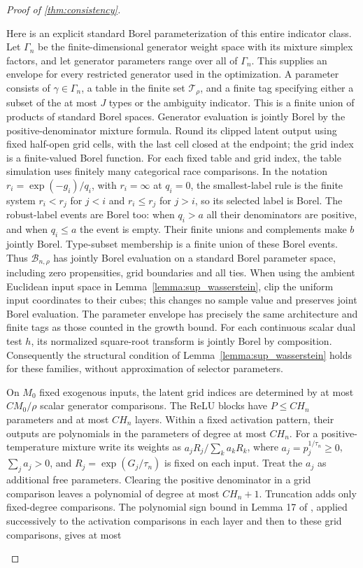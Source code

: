 \begin{proof}[Proof of \cref{thm:consistency}]
\begin{enumerate}
Here is an explicit standard Borel parameterization of this entire indicator class. Let $\Gamma_n$ be the finite-dimensional generator weight space with its mixture simplex factors, and let generator parameters range over all of $\Gamma_n$. This supplies an envelope for every restricted generator used in the optimization. A parameter consists of $\gamma\in\Gamma_n$, a table in the finite set $\mathcal T_\rho$, and a finite tag specifying either a subset of the at most $J$ types or the ambiguity indicator. This is a finite union of products of standard Borel spaces. Generator evaluation is jointly Borel by the positive-denominator mixture formula. Round its clipped latent output using fixed half-open grid cells, with the last cell closed at the endpoint; the grid index is a finite-valued Borel function. For each fixed table and grid index, the table simulation uses finitely many categorical race comparisons. In the notation $r_i=\exp(-g_i)/q_i$, with $r_i=\infty$ at $q_i=0$, the smallest-label rule is the finite system $r_i<r_j$ for $j<i$ and $r_i\leqslant r_j$ for $j>i$, so its selected label is Borel. The robust-label events are Borel too: when $q_i>a$ all their denominators are positive, and when $q_i\leqslant a$ the event is empty. Their finite unions and complements make $b$ jointly Borel. Type-subset membership is a finite union of these Borel events. Thus $\mathcal B_{n,\rho}$ has jointly Borel evaluation on a standard Borel parameter space, including zero propensities, grid boundaries and all ties. When using the ambient Euclidean input space in Lemma~\ref{lemma:sup_wasserstein}, clip the uniform input coordinates to their cubes; this changes no sample value and preserves joint Borel evaluation. The parameter envelope has precisely the same architecture and finite tags as those counted in the growth bound. For each continuous scalar dual test $h$, its normalized square-root transform is jointly Borel by composition. Consequently the structural condition of Lemma~\ref{lemma:sup_wasserstein} holds for these families, without approximation of selector parameters. 

On $M_0$ fixed exogenous inputs, the latent grid indices are determined by at most $C M_0/\rho$ scalar generator comparisons. The ReLU blocks have $P\leqslant C H_n$ parameters and at most $C H_n$ layers. Within a fixed activation pattern, their outputs are polynomials in the parameters of degree at most $C H_n$. For a positive-temperature mixture write its weights as $a_j R_j/\sum_k a_kR_k$, where $a_j=p_j^{1/\tau_n}\geqslant0$, $\sum_j a_j>0$, and $R_j=\exp(G_j/\tau_n)$ is fixed on each input. Treat the $a_j$ as additional free parameters. Clearing the positive denominator in a grid comparison leaves a polynomial of degree at most $C H_n+1$. Truncation adds only fixed-degree comparisons. The polynomial sign bound in Lemma 17 of \cite{bartlett2019nearly}, applied successively to the activation comparisons in each layer and then to these grid comparisons, gives at most


\end{enumerate}
\end{proof}
